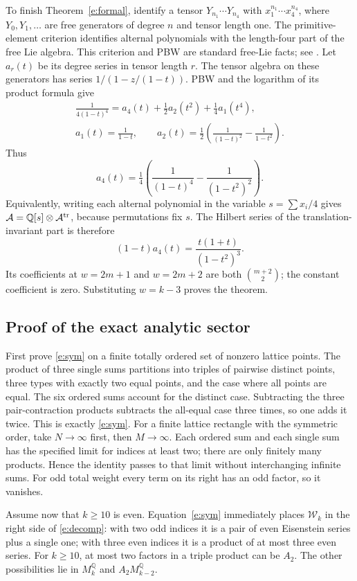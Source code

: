 \documentclass[12pt]{amsart}
\theoremstyle{definition}
\theoremstyle{remark}
\numberwithin{equation}{section}
\newcommand{\Q}{\mathbb{Q}}
\newcommand{\WW}{\mathcal W}
\newcommand{\Al}{\mathcal A}
\numberwithin{equation}{section}
\begin{document}
To finish Theorem~\ref{e:formal}, identify a tensor
$Y_{n_1}\cdots Y_{n_4}$ with $x_1^{n_1}\cdots x_4^{n_4}$, where
$Y_0,Y_1,\ldots$ are free generators of degree $n$ and tensor length one.
The primitive-element criterion identifies alternal polynomials with the
length-four part of the free Lie algebra. This criterion and PBW are
standard free-Lie facts; see \cite{reutenauer}.
Let $a_r(t)$ be its degree series in tensor length $r$.
The tensor algebra on these generators has series
$1/(1-z/(1-t))$. PBW and the logarithm of its product formula give
\[
 \begin{gathered}
 \frac{1}{4(1-t)^4}=a_4(t)+\tfrac12a_2(t^2)+\tfrac14a_1(t^4),
 \\ a_1(t)=\frac1{1-t},\qquad
 a_2(t)=\tfrac12\left(\frac1{(1-t)^2}-\frac1{1-t^2}\right).
 \end{gathered}
\]
Thus
\[
 a_4(t)=\tfrac14\left(\frac1{(1-t)^4}-\frac1{(1-t^2)^2}\right).
\]
Equivalently, writing each alternal polynomial in the variable
$s=\sum x_i/4$ gives $\Al=\Q[s]\otimes\Al^{\rm tr}$, because permutations
fix $s$. The Hilbert series of the translation-invariant part is therefore
\[
 (1-t)a_4(t)=\frac{t(1+t)}{(1-t^2)^3}.
\]
Its coefficients at $w=2m+1$ and $w=2m+2$ are both $\binom{m+2}{2}$;
the constant coefficient is zero. Substituting $w=k-3$ proves the theorem.

\subsection{Proof of the exact analytic sector}
First prove \eqref{e:sym} on a finite totally ordered set of nonzero lattice
points. The product of three single sums partitions into triples of pairwise
distinct points, three types with exactly two equal points, and the case
where all points are equal. The six ordered sums account for the distinct
case. Subtracting the three pair-contraction products subtracts the all-equal
case three times, so one adds it twice. This is exactly \eqref{e:sym}.
For a finite lattice rectangle with the symmetric order, take $N\to\infty$
first, then $M\to\infty$. Each ordered sum and each single sum has the
specified limit for indices at least two; there are only finitely many
products. Hence the identity passes to that limit without interchanging
infinite sums. For odd total weight every term on its right has an odd
factor, so it vanishes.

Assume now that $k\ge10$ is even. Equation~\eqref{e:sym} immediately places
$\WW_k$ in the right side of \eqref{e:decomp}: with two odd indices it
is a pair of even Eisenstein series plus a single one; with three even
indices it is a product of at most three even series. For $k\ge10$, at most
two factors in a triple product can be $A_2$. The other possibilities lie in
$M_k^{\Q}$ and $A_2M_{k-2}^{\Q}$.
\end{document}
